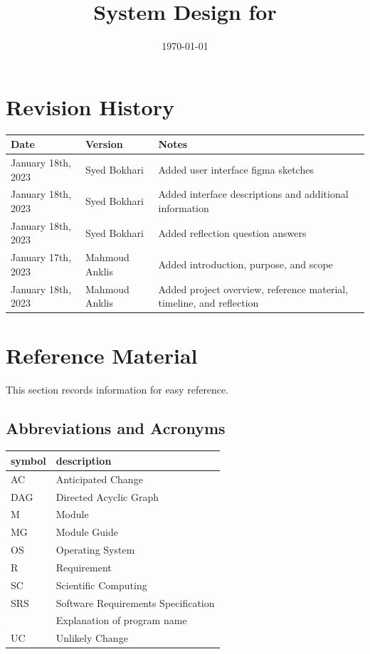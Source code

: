 \documentclass[12pt, titlepage]{article}
\begin{document}
\title{System Design for \progname{}} 
\author{\authname}
\date{\today}

\maketitle


\section{Revision History}

\begin{tabularx}{\textwidth}{p{3cm}p{2cm}X}
	\toprule {\bf Date} & {\bf Version} & {\bf Notes}\\
	\midrule
	January 18th, 2023 & Syed Bokhari & Added user interface figma sketches\\
	January 18th, 2023 & Syed Bokhari & Added interface descriptions and additional information\\
	January 18th, 2023 & Syed Bokhari & Added reflection question answers\\
	January 17th, 2023 & Mahmoud Anklis & Added introduction, purpose, and scope\\
	January 18th, 2023 & Mahmoud Anklis & Added project overview, reference material, timeline, and reflection\\
	\bottomrule
\end{tabularx}

\newpage

\section{Reference Material}

This section records information for easy reference.

\subsection{Abbreviations and Acronyms}

\renewcommand{\arraystretch}{1.2}
\begin{tabular}{l l} 
	\toprule		
	\textbf{symbol} & \textbf{description}\\
	\midrule 
	AC & Anticipated Change\\
	DAG & Directed Acyclic Graph \\
	M & Module \\
	MG & Module Guide \\
	OS & Operating System \\
	R & Requirement\\
	SC & Scientific Computing \\
	SRS & Software Requirements Specification\\
	\progname & Explanation of program name\\
	UC & Unlikely Change \\
	\bottomrule
\end{tabular}\\
\end{document}
